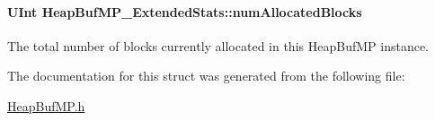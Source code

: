 \paragraph[{numAllocatedBlocks}]{\setlength{\rightskip}{0pt plus 5cm}UInt {\bf HeapBufMP\_\-ExtendedStats::numAllocatedBlocks}}\hfill\label{struct_heap_buf_m_p___extended_stats_a757dc392845103b1e5b31ab02d17bef5}
The total number of blocks currently allocated in this HeapBufMP instance. 

The documentation for this struct was generated from the following file:\begin{DoxyCompactItemize}
\item 
\hyperlink{_heap_buf_m_p_8h}{HeapBufMP.h}\end{DoxyCompactItemize}
